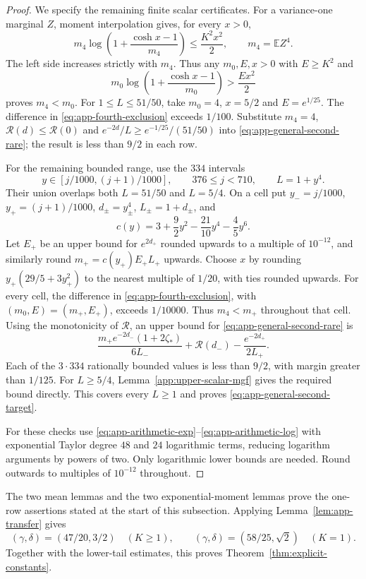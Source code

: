 \documentclass[11pt,a4paper]{article}
\newcommand{\E}{\mathbb E}
\numberwithin{equation}{section}
\begin{document}
\begin{proof}
We specify the remaining finite scalar certificates.
For a variance-one marginal $Z$, moment interpolation gives, for every $x>0$,
\[
 m_4\log\left(1+\frac{\cosh x-1}{m_4}\right)\le\frac{K^2x^2}{2},
 \qquad m_4=\E Z^4.
\]
The left side increases strictly with $m_4$.
Thus any $m_0,E,x>0$ with $E\ge K^2$ and
\begin{equation}\label{eq:app-fourth-exclusion}
 m_0\log\left(1+\frac{\cosh x-1}{m_0}\right)>\frac{Ex^2}{2}
\end{equation}
proves $m_4<m_0$.
For $1\le L\le51/50$, take $m_0=4$, $x=5/2$ and $E=e^{1/25}$.
The difference in \eqref{eq:app-fourth-exclusion} exceeds $1/100$.
Substitute $m_4=4$, $\mathcal R(d)\le\mathcal R(0)$ and
$e^{-2d}/L\ge e^{-1/25}/(51/50)$ into
\eqref{eq:app-general-second-rare}; the result is less than $9/2$
in each row.

For the remaining bounded range, use the $334$ intervals
\[
 y\in[j/1000,(j+1)/1000],\qquad376\le j<710,
 \qquad L=1+y^4.
\]
Their union overlaps both $L=51/50$ and $L=5/4$.
On a cell put $y_-=j/1000$, $y_+=(j+1)/1000$,
$d_\pm=y_\pm^4$, $L_\pm=1+d_\pm$, and
\[
 c(y)=3+\frac92y^2-\frac{21}{10}y^4-\frac45y^6.
\]
Let $E_+$ be an upper bound for $e^{2d_+}$ rounded upwards to a
multiple of $10^{-12}$, and similarly round
$m_+=c(y_+)E_+L_+$ upwards.
Choose $x$ by rounding $y_+(29/5+3y_+^2)$ to the nearest multiple
of $1/20$, with ties rounded upwards.
For every cell, the difference in \eqref{eq:app-fourth-exclusion},
with $(m_0,E)=(m_+,E_+)$, exceeds $1/10000$.
Thus $m_4<m_+$ throughout that cell.
Using the monotonicity of $\mathcal R$, an upper bound for
\eqref{eq:app-general-second-rare} is
\[
 \frac{m_+e^{-2d_-}(1+2\zeta_*)}{6L_-}
       +\mathcal R(d_-)-\frac{e^{-2d_+}}{2L_+}.
\]
Each of the $3\cdot334$ rationally bounded values is less than $9/2$,
with margin greater than $1/125$.
For $L\ge5/4$, Lemma~\ref{app:upper-scalar-mgf} gives the required bound directly.
This covers every $L\ge1$ and proves
\eqref{eq:app-general-second-target}.

For these checks use \eqref{eq:app-arithmetic-exp}--\eqref{eq:app-arithmetic-log}
with exponential
Taylor degree $48$ and $24$ logarithmic terms, reducing logarithm
arguments by powers of two. Only logarithmic lower bounds are needed.
Round outwards to multiples of $10^{-12}$ throughout.
\end{proof}

The two mean lemmas and the two exponential-moment lemmas prove the
one-row assertions stated at the start of this subsection.
Applying Lemma~\ref{lem:app-transfer} gives
\[
 (\gamma,\delta)=(47/20,3/2)\quad(K\ge1),\qquad
 (\gamma,\delta)=(58/25,\sqrt2)\quad(K=1).
\]
Together with the lower-tail estimates, this proves
Theorem~\ref{thm:explicit-constants}.
\end{document}
